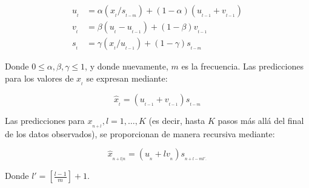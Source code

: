 \documentclass[
  us-letterpaper,
]{scrreprt}
\theoremstyle{plain}
\theoremstyle{definition}
\theoremstyle{plain}
\theoremstyle{definition}
\theoremstyle{remark}
\begin{document}
\[
\begin{split}
u_{_t}&= \alpha(x_{_t}/s_{_{t-m}})+(1-\alpha)(u_{_{t-1}}+v_{_{t-1}})\\
v_{_t}&= \beta(u_{_t}-u_{_{t-1}})+(1-\beta)v_{_{t-1}}\\
s_{_t}&= \gamma(x_{_t}/u_{_{t-1}})+(1-\gamma)s_{_{t-m}}
\end{split}
\]

Donde \(0 \le \alpha, \beta, \gamma \le 1\), y donde nuevamente, \(m\)
es la frecuencia. Las predicciones para los valores de \(x_{_t}\) se
expresan mediante:

\[ \hat{x}_{_t}= (u_{_{t-1}}+v_{_{t-1}})s_{_{t-m}} \]

Las predicciones para \(x_{_{n+l}}, l=1,\ldots,K\) (es decir, hasta
\(K\) pasos más allá del final de los datos observados), se proporcionan
de manera recursiva mediante:

\[
\hat{x}_{_{n+l|n}}=(u_{_n}+lv_{_n})s_{_{n+l-ml'.}}
\]

Donde \(l' =\left[ \frac{l-1}{m} \right] + 1\).
\end{document}
